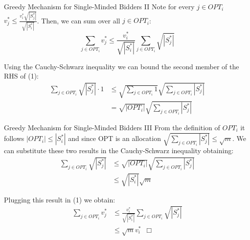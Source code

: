 \documentclass[aspectratio=169,xcolor=dvipsnames]{beamer}
\begin{document}
    \begin{frame}{Greedy Mechanism for Single-Minded Bidders II}
    Note for every $j \in OPT_i$  $v^{*}_{j} \leq \frac{v^{*}_{i} \sqrt{|S^{*}_{j}|}  }{\sqrt{|S^{*}_{i}|}}$. Then, we can sum over all $j \in OPT_{i}$:
    \begin{equation}
    \sum_{j \in OPT_{i}}v^{*}_{j} \leq \frac{v^{*}_{i} }{\sqrt{|S^{*}_{i}|}} \sum_{j \in OPT_{i}} \sqrt{|S^{*}_{j}|}
    \end{equation}

    Using the Cauchy-Schwarz inequality we can bound the second member of the RHS of (1):
    \begin{align*}
        \sum_{j \in OPT_{i}} \sqrt{|S^{*}_{j}|}\cdot 1 &\leq \sqrt{\sum_{j \in OPT_{i}}1} \sqrt{\sum_{j \in OPT_{i}}|S^{*}_{j}| }\\
          &= \sqrt{| OPT_{i}|} \sqrt{\sum_{j \in OPT_{i}}|S^{*}_{j}| }
    \end{align*}
    \end{frame}
    
    \begin{frame}{Greedy Mechanism for Single-Minded Bidders III}
    From the definition of $OPT_{i}$ it follows $|OPT_{i}| \leq |S^{*}_{i}|$ and since OPT is an allocation $\sqrt{\sum_{j \in OPT_{i}} |S^{*}_{j}|} \leq \sqrt{m}$. 
     We can substitute these two results in the Cauchy-Schwarz inequality obtaining:
    \vspace{-5pt}
    \begin{align*}
        \sum_{j \in OPT_{i}} \sqrt{|S^{*}_{j}|} &\leq \sqrt{| OPT_{i}|} \sqrt{\sum_{j \in OPT_{i}}|S^{*}_{j}| }\\
                                                &\leq \sqrt{|S^{*}_{i}|}\sqrt{m}
    \end{align*}
    

    Plugging this result in (1) we obtain:
    \vspace{-5pt}
    \begin{align*}
    \sum_{j \in OPT_{i}}v^{*}_{j} &\leq \frac{v^{*}_{i} }{\sqrt{|S^{*}_{i}|}} \sum_{j \in OPT_{i}} \sqrt{|S^{*}_{j}|} \\
                                  &\leq  \sqrt{m} v^{*}_{i} \hspace{6pt} \Box 
    \end{align*}
    
    \end{frame}
     
\end{document}
